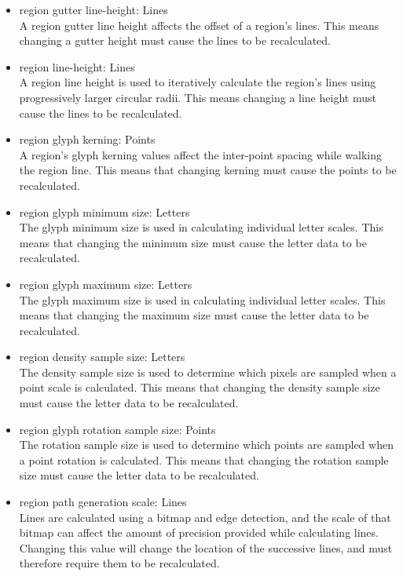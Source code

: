 \begin{itemize}
      \item region gutter line-height: Lines \\
            A region gutter line height affects the offset of a region's lines.
            This means changing a gutter height must cause the lines to be recalculated.

      \item region line-height: Lines \\
            A region line height is used to iteratively calculate the region's lines using progressively larger circular radii.
            This means changing a line height must cause the lines to be recalculated.

      \item region glyph kerning: Points \\
            A region's glyph kerning values affect the inter-point spacing while walking the region line.
            This means that changing kerning must cause the points to be recalculated.

      \item region glyph minimum size: Letters \\
            The glyph minimum size is used in calculating individual letter scales.
            This means that changing the minimum size must cause the letter data to be recalculated.

      \item region glyph maximum size: Letters \\
            The glyph maximum size is used in calculating individual letter scales.
            This means that changing the maximum size must cause the letter data to be recalculated.

      \item region density sample size: Letters \\
            The density sample size is used to determine which pixels are sampled when a point scale is calculated.
            This means that changing the density sample size must cause the letter data to be recalculated.

      \item region glyph rotation sample size: Points \\
            The rotation sample size is used to determine which points are sampled when a point rotation is calculated.
            This means that changing the rotation sample size must cause the letter data to be recalculated.

      \item region path generation scale: Lines \\
            Lines are calculated using a bitmap and edge detection, and the scale of that bitmap can affect the amount of precision provided while calculating lines.
            Changing this value will change the location of the successive lines, and must therefore require them to be recalculated.
\end{itemize}

